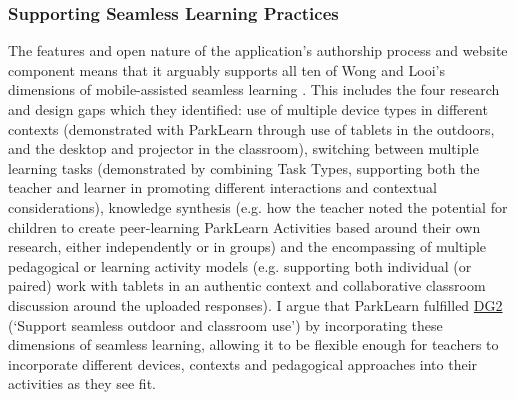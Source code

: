 \subsubsection{Supporting Seamless Learning Practices}

The features and open nature of the application's authorship process and website component means that it arguably supports all ten of Wong and Looi’s dimensions of mobile-assisted seamless learning \citep{Wong2011}.  This includes the four research and design gaps which they identified: use of multiple device types in different contexts (demonstrated with ParkLearn through use of tablets in the outdoors, and the desktop and projector in the classroom), switching between multiple learning tasks (demonstrated by combining Task Types, supporting both the teacher and learner in promoting different interactions and contextual considerations), knowledge synthesis (e.g. how the teacher noted the potential for children to create peer-learning ParkLearn Activities based around their own research, either independently or in groups) and the encompassing of multiple pedagogical or learning activity models (e.g. supporting both individual (or paired) work with tablets in an authentic context and collaborative classroom discussion around the uploaded responses). I argue that ParkLearn fulfilled \hyperref[DG2]{DG2} (`Support seamless outdoor and classroom use') by incorporating these dimensions of seamless learning, allowing it to be flexible enough for teachers to incorporate different devices, contexts and pedagogical approaches into their activities as they see fit.
  
